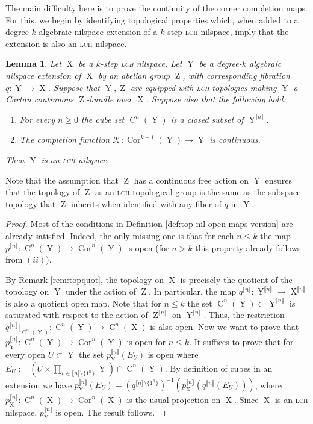 \documentclass[a4paper,12pt,reqno]{amsart}
\newtheorem{lemma}[theorem]{Lemma}
\theoremstyle{definition}
\def\to{\rightarrow}
\newcommand*{\db}[1]{\llbracket #1\rrbracket}
\newcommand{\mc}{\mathcal}
\DeclareMathOperator{\ab}{Z}
\DeclareMathOperator{\ns}{X}
\DeclareMathOperator{\nss}{Y}
\DeclareMathOperator{\cu}{C}
\DeclareMathOperator{\cor}{Cor}
\begin{document}
\noindent The main difficulty here is to prove the continuity of the corner completion maps. For this, we begin by identifying topological properties which, when added to a degree-$k$ algebraic nilspace extension of a $k$-step \textsc{lch} nilspace, imply that the extension is also an \textsc{lch} nilspace.
\begin{lemma}\label{lem:top-degree-k-k-ext}
Let $\ns$ be a $k$-step \textsc{lch} nilspace. Let $\nss$ be a degree-$k$ algebraic nilspace extension of $\ns$ by an abelian group $\ab$, with corresponding fibration $q:\nss\to\ns$. Suppose that $\nss,\ab$ are equipped with \textsc{lch} topologies making $\nss$ a Cartan continuous $\ab$-bundle over $\ns$. Suppose also that the following  hold:
\setlength{\leftmargini}{0.8cm}
\begin{enumerate}
    \item For every $n\geq 0$ the cube set $\cu^n(\nss)$ is a closed subset of $\nss^{\db{n}}$.
    \item The completion function $\mc{K}:\cor^{k+1}(\nss)\to \nss$ is continuous.
\end{enumerate}
Then $\nss$ is an \textsc{lch} nilspace.
\end{lemma}
\noindent Note that the assumption that $\ab$ has a continuous free action on $\nss$ ensures that the topology of $\ab$ as an \textsc{lch} topological group is the same as the subspace topology that $\ab$ inherits when identified with any fiber of $q$ in $\nss$.
\begin{proof}
Most of the conditions in Definition \ref{def:top-nil-open-maps-version} are already satisfied. Indeed, the only missing one is that for each $n\le k$ the map $p^{\db{n}}:\cu^n(\nss)\to\cor^n(\nss)$ is open (for $n >k$ this property already follows from $(ii)$).

By Remark \ref{rem:topquot}, the topology on $\ns$ is precisely the quotient of the topology on $\nss$ under the action of $\ab$. In particular, the map $q^{\db{n}}:\nss^{\db{n}}\to \ns^{\db{n}}$ is also a quotient open map. Note that for $n\leq k$ the set $\cu^n(\nss)\subset \nss^{\db{n}}$ is saturated with respect to the action of $\ab^{\db{n}}$ on $\nss^{\db{n}}$. Thus, the restriction $q^{\db{n}}|_{\cu^n(\nss)}:\cu^n(\nss)\to \cu^n(\ns)$ is also open. Now we want to prove that $p^{\db{n}}_{\nss}:\cu^n(\nss)\to \cor^n(\nss)$ is open for $n\le k$. It suffices to prove that for every open $U\subset \nss$ the set $p_{\nss}^{\db{n}}(E_U)$ is open where $E_U:=\left(U\times \prod_{v\in\db{n}\setminus\{1^n\}} \nss\right)\cap\cu^{n}(\nss)$. By definition of cubes in an extension we have $p_{\nss}^{\db{n}}(E_U) = (q^{\db{n}\setminus\{1^n\}})^{-1}(p^{\db{n}}_{\ns}(q^{\db{n}}(E_U)))$, where $p^{\db{n}}_{\ns}:\cu^n(\ns)\to \cor^n(\ns)$ is the usual projection on $\ns$. Since $\ns$ is an \textsc{lch} nilspace, $p^{\db{n}}_{\nss}$ is open. The result follows.
\end{proof}
\end{document}
